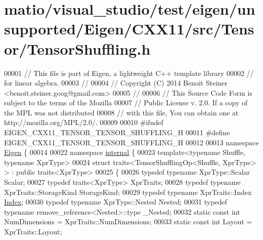 \hypertarget{matio_2visual__studio_2test_2eigen_2unsupported_2_eigen_2_c_x_x11_2src_2_tensor_2_tensor_shuffling_8h_source}{}\section{matio/visual\+\_\+studio/test/eigen/unsupported/\+Eigen/\+C\+X\+X11/src/\+Tensor/\+Tensor\+Shuffling.h}
\label{matio_2visual__studio_2test_2eigen_2unsupported_2_eigen_2_c_x_x11_2src_2_tensor_2_tensor_shuffling_8h_source}

\begin{DoxyCode}
00001 \textcolor{comment}{// This file is part of Eigen, a lightweight C++ template library}
00002 \textcolor{comment}{// for linear algebra.}
00003 \textcolor{comment}{//}
00004 \textcolor{comment}{// Copyright (C) 2014 Benoit Steiner <benoit.steiner.goog@gmail.com>}
00005 \textcolor{comment}{//}
00006 \textcolor{comment}{// This Source Code Form is subject to the terms of the Mozilla}
00007 \textcolor{comment}{// Public License v. 2.0. If a copy of the MPL was not distributed}
00008 \textcolor{comment}{// with this file, You can obtain one at http://mozilla.org/MPL/2.0/.}
00009 
00010 \textcolor{preprocessor}{#ifndef EIGEN\_CXX11\_TENSOR\_TENSOR\_SHUFFLING\_H}
00011 \textcolor{preprocessor}{#define EIGEN\_CXX11\_TENSOR\_TENSOR\_SHUFFLING\_H}
00012 
00013 \textcolor{keyword}{namespace }\hyperlink{namespace_eigen}{Eigen} \{
00014 
00022 \textcolor{keyword}{namespace }\hyperlink{namespaceinternal}{internal} \{
00023 \textcolor{keyword}{template}<\textcolor{keyword}{typename} Shuffle, \textcolor{keyword}{typename} XprType>
00024 \textcolor{keyword}{struct }traits<TensorShufflingOp<Shuffle, XprType> > : \textcolor{keyword}{public} traits<XprType>
00025 \{
00026   \textcolor{keyword}{typedef} \textcolor{keyword}{typename} XprType::Scalar Scalar;
00027   \textcolor{keyword}{typedef} traits<XprType> XprTraits;
00028   \textcolor{keyword}{typedef} \textcolor{keyword}{typename} XprTraits::StorageKind StorageKind;
00029   \textcolor{keyword}{typedef} \textcolor{keyword}{typename} XprTraits::Index \hyperlink{namespace_eigen_a62e77e0933482dafde8fe197d9a2cfde}{Index};
00030   \textcolor{keyword}{typedef} \textcolor{keyword}{typename} XprType::Nested Nested;
00031   \textcolor{keyword}{typedef} \textcolor{keyword}{typename} remove\_reference<Nested>::type \_Nested;
00032   \textcolor{keyword}{static} \textcolor{keyword}{const} \textcolor{keywordtype}{int} NumDimensions = XprTraits::NumDimensions;
00033   \textcolor{keyword}{static} \textcolor{keyword}{const} \textcolor{keywordtype}{int} Layout = XprTraits::Layout;

\end{DoxyCode}
